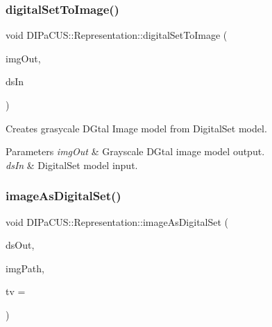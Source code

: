 \subsubsection{\texorpdfstring{digital\+Set\+To\+Image()}{digitalSetToImage()}}
{\footnotesize\ttfamily void D\+I\+Pa\+C\+U\+S\+::\+Representation\+::digital\+Set\+To\+Image (\begin{DoxyParamCaption}\item[{\hyperlink{namespaceDIPaCUS_1_1Representation_ae97917e89f57298fda1626daad9f1733}{Image2D} \&}]{img\+Out,  }\item[{const \hyperlink{namespaceDIPaCUS_1_1Representation_a6eca0b4fa262f2d600f11d82ee10b5a6}{Digital\+Set} \&}]{ds\+In }\end{DoxyParamCaption})}



Creates grasycale D\+Gtal Image model from Digital\+Set model. 


\begin{DoxyParams}{Parameters}
{\em img\+Out} & Grayscale D\+Gtal image model output. \\
\hline
{\em ds\+In} & Digital\+Set model input. \\
\hline
\end{DoxyParams}
\mbox{\label{namespaceDIPaCUS_1_1Representation_a2b07e44f7c61b0a3b971cbda49aa0d88}} 
\subsubsection{\texorpdfstring{image\+As\+Digital\+Set()}{imageAsDigitalSet()}\hspace{0.1cm}{\footnotesize\ttfamily [1/2]}}
{\footnotesize\ttfamily void D\+I\+Pa\+C\+U\+S\+::\+Representation\+::image\+As\+Digital\+Set (\begin{DoxyParamCaption}\item[{\hyperlink{namespaceDIPaCUS_1_1Representation_a6eca0b4fa262f2d600f11d82ee10b5a6}{Digital\+Set} \&}]{ds\+Out,  }\item[{const std\+::string \&}]{img\+Path,  }\item[{const \hyperlink{namespaceDIPaCUS_1_1Representation_a85996f90f0c4186ddae15b4f372bf875}{Threshold\+Value}}]{tv = {} }\end{DoxyParamCaption})}



